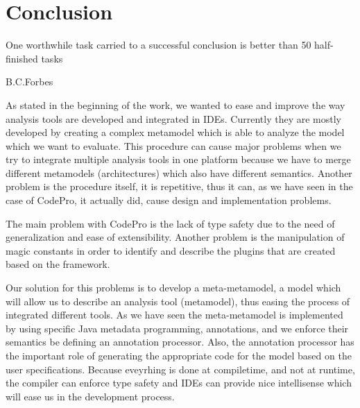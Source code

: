 \chapter{Conclusion}\label{ch:4}

\epigraph{One worthwhile task carried to a successful conclusion is better than
50 half-finished tasks }{B.C.Forbes}

	As stated in the beginning of the work, we wanted to ease and improve the way
analysis tools are developed and integrated in IDEs. Currently they are
mostly developed by creating a complex metamodel which is able to analyze the
model which we want to evaluate. This procedure can cause major problems when we
try to integrate multiple analysis tools in one platform because we have to
merge different metamodels (architectures) which also have different semantics.
Another problem is the procedure itself, it is repetitive, thus it can, as we
have seen in the case of CodePro, it actually did, cause design and
implementation problems.

	The main problem with CodePro is the lack of type safety due to the need of
generalization and ease of extensibility. Another problem is the manipulation of
magic constants in order to identify and describe the plugins that are created
based on the framework. 

	Our solution for this problems is to develop a meta-metamodel, a model which
will allow us to describe an analysis tool (metamodel), thus easing the process of 
integrated different tools. As we have seen the meta-metamodel is
implemented by using specific Java metadata programming, annotations, and we
enforce their semantics be defining an annotation processor. Also, the
annotation processor has the important role of generating the appropriate code
for the model based on the user specifications. Because eveyrhing is done at
compiletime, and not at runtime, the compiler can enforce type safety and IDEs
can provide nice intellisense which will ease us in the development process.
	
	
